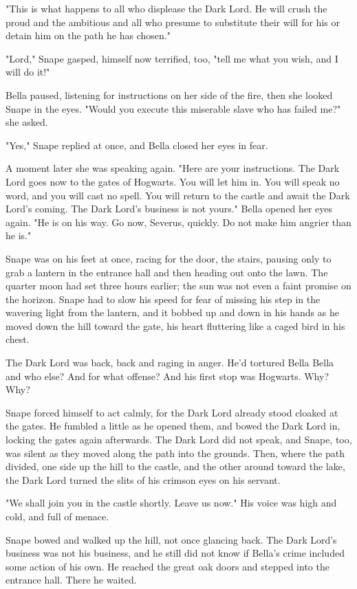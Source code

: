 "This is what happens to all who displease the Dark Lord. He will crush the proud and the ambitious and all who presume to substitute their will for his or detain him on the path he has chosen."

"Lord," Snape gasped, himself now terrified, too, "tell me what you wish, and I will do it!"

Bella paused, listening for instructions on her side of the fire, then she looked Snape in the eyes. "Would you execute this miserable slave who has failed me?" she asked.

"Yes," Snape replied at once, and Bella closed her eyes in fear.

A moment later she was speaking again. "Here are your instructions. The Dark Lord goes now to the gates of Hogwarts. You will let him in. You will speak no word, and you will cast no spell. You will return to the castle and await the Dark Lord's coming. The Dark Lord's business is not yours." Bella opened her eyes again. "He is on his way. Go now, Severus, quickly. Do not make him angrier than he is."

Snape was on his feet at once, racing for the door, the stairs, pausing only to grab a lantern in the entrance hall and then heading out onto the lawn. The quarter moon had set three hours earlier; the sun was not even a faint promise on the horizon. Snape had to slow his speed for fear of missing his step in the wavering light from the lantern, and it bobbed up and down in his hands as he moved down the hill toward the gate, his heart fluttering like a caged bird in his chest.

The Dark Lord was back, back and raging in anger. He'd tortured Bella{\el} Bella and who else? And for what offense? And his first stop was Hogwarts. Why? Why?

Snape forced himself to act calmly, for the Dark Lord already stood cloaked at the gates. He fumbled a little as he opened them, and bowed the Dark Lord in, locking the gates again afterwards. The Dark Lord did not speak, and Snape, too, was silent as they moved along the path into the grounds. Then, where the path divided, one side up the hill to the castle, and the other around toward the lake, the Dark Lord turned the slits of his crimson eyes on his servant.

"We shall join you in the castle shortly. Leave us now." His voice was high and cold, and full of menace.

Snape bowed and walked up the hill, not once glancing back. The Dark Lord's business was not his business, and he still did not know if Bella's crime included some action of his own. He reached the great oak doors and stepped into the entrance hall. There he waited.

